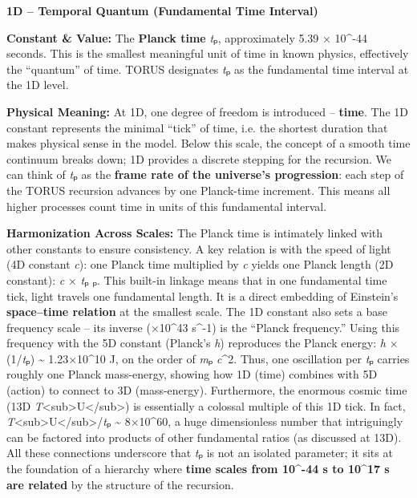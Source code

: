 \documentclass[
]{article}
\begin{document}
\textbf{1D -- Temporal Quantum (Fundamental Time Interval)}

\textbf{Constant \& Value:} The \textbf{Planck time} \emph{t}ₚ,
approximately 5.39 × 10\^{}-44 seconds\hspace{0pt}. This is the smallest
meaningful unit of time in known physics, effectively the ``quantum'' of
time. TORUS designates \emph{t}ₚ as the fundamental time interval at the
1D level.

\textbf{Physical Meaning:} At 1D, one degree of freedom is introduced --
\textbf{time}. The 1D constant represents the minimal ``tick'' of time,
i.e. the shortest duration that makes physical sense in the
model\hspace{0pt}. Below this scale, the concept of a smooth time
continuum breaks down; 1D provides a discrete stepping for the
recursion. We can think of \emph{t}ₚ as the \textbf{frame rate of the
universe's progression}\hspace{0pt}: each step of the TORUS recursion
advances by one Planck-time increment. This means all higher processes
count time in units of this fundamental interval.

\textbf{Harmonization Across Scales:} The Planck time is intimately
linked with other constants to ensure consistency. A key relation is
with the speed of light (4D constant \emph{c}): one Planck time
multiplied by \emph{c} yields one Planck length (2D constant): \emph{c}
× \emph{t}ₚ \approx \emph{\ell}ₚ\hspace{0pt}. This built-in linkage means that in
one fundamental time tick, light travels one fundamental length. It is a
direct embedding of Einstein's \textbf{space--time relation} at the
smallest scale. The 1D constant also sets a base frequency scale -- its
inverse (×10\^{}43 s\^{}-1) is the ``Planck frequency.'' Using
this frequency with the 5D constant (Planck's \emph{h}) reproduces the
Planck energy: \emph{h} × (1/\emph{t}ₚ) \textasciitilde{} 1.23×10\^{}10
J, on the order of \emph{m}ₚ \emph{c}\^{}2\hspace{0pt}. Thus, one
oscillation per \emph{t}ₚ carries roughly one Planck mass-energy,
showing how 1D (time) combines with 5D (action) to connect to 3D
(mass-energy). Furthermore, the enormous cosmic time (13D
\emph{T}\textless sub\textgreater U\textless/sub\textgreater) is
essentially a colossal multiple of this 1D tick. In fact,
\emph{T}\textless sub\textgreater U\textless/sub\textgreater/\emph{t}ₚ
\textasciitilde{} 8×10\^{}60, a huge dimensionless number that
intriguingly can be factored into products of other fundamental ratios
(as discussed at 13D)\hspace{0pt}. All these connections underscore that
\emph{t}ₚ is not an isolated parameter; it sits at the foundation of a
hierarchy where \textbf{time scales from 10\^{}-44 s to 10\^{}17 s are
related} by the structure of the recursion.
\end{document}
